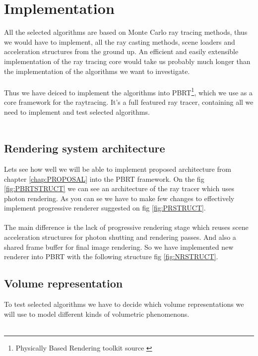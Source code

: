 \chapter{Implementation}
\label{chap:IMPLEM}
All the selected algorithms are based on Monte Carlo ray tracing methods, thus we would have to implement, all the ray casting methods, scene loaders and acceleration structures from the ground up. An efficient and easily extensible implementation of the ray tracing core would take us probably much longer than the implementation of the algorithms we want to investigate.
\\
\\
Thus we have deiced to implement the algorithms into PBRT\footnote{Physically Based Rendering toolkit source \cite{PBRT}}, which we use as a core framework for the raytracing. It's a full featured ray tracer, containing all we need to implement and test selected algorithms.
\\
\\
\section{Rendering system architecture}
Lets see how well we will be able to implement proposed architecture from chapter \ref{chap:PROPOSAL} into the PBRT framework. On the fig \ref{fig:PBRTSTRUCT} we can see an architecture of the ray tracer which uses photon rendering. As you can se we have to make few changes to effectively implement progressive renderer suggested on fig \ref{fig:PRSTRUCT}.
\\
\\
The main difference is the lack of progressive rendering stage which reuses scene acceleration structures for photon shutting and rendering passes. And also a shared frame buffer for final image rendering. So we have implemented new renderer into PBRT with the following structure fig \ref{fig:NRSTRUCT}.



\section{Volume representation}
To test selected algorithms we have to decide which volume representations we will use to model different kinds of volumetric phenomenons.
\\
\\
